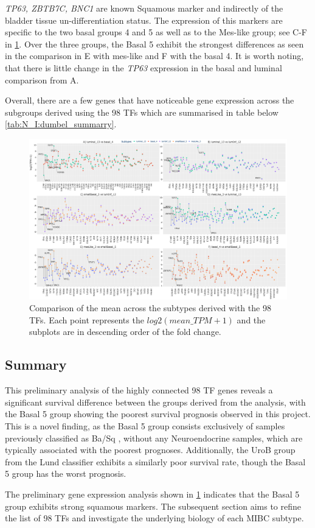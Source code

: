 \textit{TP63, ZBTB7C, BNC1} are known Squamous marker \citep{Robertson2023-na,Fishwick2017-kd} and indirectly of the bladder tissue un-differentiation status. The expression of this markers are specific to the two basal groups 4 and 5 as well as to the Mes-like group; see C-F in \cref{fig:N_I:dumbell_sel_tfs}.  Over the three groups, the Basal 5 exhibit the strongest differences as seen in the comparison in E with mes-like and F with the basal 4. It is worth noting, that there is little change in the \textit{TP63} expression in the basal and luminal comparison from A. 

Overall, there are a few genes that have noticeable gene expression across the subgroups derived using the 98 TFs which are summarised in table below \cref{tab:N_I:dumbel_summarry}.

\begin{figure}

    \centering
    \includegraphics[width=1.0\textwidth,keepaspectratio]{Sections/Network_I/Resources/selective_pruning/dumbell_sel_tfs.png}
      \caption{Comparison of the mean across the subtypes derived with the 98 TFs. Each point represents the $log2(mean\_TPM+1)$ and the subplots are in descending order of the fold change.}
    \label{fig:N_I:dumbell_sel_tfs}
\end{figure}


\subsection{Summary}

This preliminary analysis of the highly connected 98 TF genes reveals a significant survival difference between the groups derived from the analysis, with the Basal 5 group showing the poorest survival prognosis observed in this project. This is a novel finding, as the Basal 5 group consists exclusively of samples previously classified as Ba/Sq \citep{Kamoun2020-tj,Robertson2017-mg}, without any Neuroendocrine samples, which are typically associated with the poorest prognoses. Additionally, the UroB group from the Lund classifier \citep{Marzouka2018-ge} exhibits a similarly poor survival rate, though the Basal 5 group has the worst prognosis.

The preliminary gene expression analysis shown in \cref{fig:N_I:dumbell_sel_tfs} indicates that the Basal 5 group exhibits strong squamous markers. The subsequent section aims to refine the list of 98 TFs and investigate the underlying biology of each MIBC subtype.




